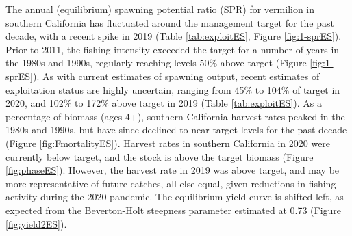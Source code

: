 \documentclass[11pt,
  english,
  a4paper,
]{article}
\begin{document}
The annual (equilibrium) spawning potential ratio (SPR) for vermilion in southern California has fluctuated around the management target for the past decade, with a recent spike in 2019 (Table \ref{tab:exploitES}, Figure \ref{fig:1-sprES}). Prior to 2011, the fishing intensity exceeded the target for a number of years in the 1980s and 1990s, regularly reaching levels 50\% above target (Figure \ref{fig:1-sprES}). As with current estimates of spawning output, recent estimates of exploitation status are highly uncertain, ranging from 45\% to 104\% of target in 2020, and 102\% to 172\% above target in 2019 (Table \ref{tab:exploitES}). As a percentage of biomass (ages 4+), southern California harvest rates peaked in the 1980s and 1990s, but have since declined to near-target levels for the past decade (Figure \ref{fig:FmortalityES}). Harvest rates in southern California in 2020 were currently below target, and the stock is above the target biomass (Figure \ref{fig:phaseES}). However, the harvest rate in 2019 was above target, and may be more representative of future catches, all else equal, given reductions in fishing activity during the 2020 pandemic. The equilibrium yield curve is shifted left, as expected from the Beverton-Holt steepness parameter estimated at 0.73 (Figure \ref{fig:yield2ES}).
\end{document}
